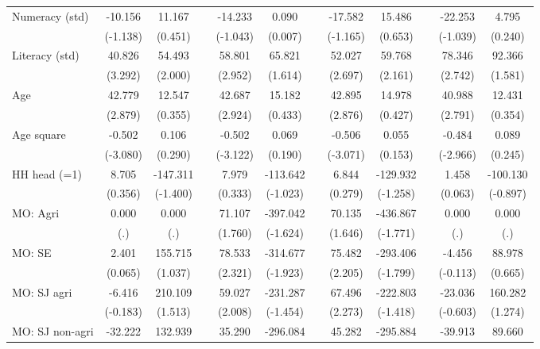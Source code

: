 {\begin{longtable}{@{\extracolsep{\fill}}lccccccccccc}
    Numeracy (std) & -10.156 & 11.167 &       & -14.233 & 0.090 &       & -17.582 & 15.486 &       & -22.253 & 4.795 \\
          & (-1.138) & (0.451) &       & (-1.043) & (0.007) &       & (-1.165) & (0.653) &       & (-1.039) & (0.240) \\
    Literacy (std) & 40.826 & 54.493 &       & 58.801 & 65.821 &       & 52.027 & 59.768 &       & 78.346 & 92.366 \\
          & (3.292) & (2.000) &       & (2.952) & (1.614) &       & (2.697) & (2.161) &       & (2.742) & (1.581) \\
    Age   & 42.779 & 12.547 &       & 42.687 & 15.182 &       & 42.895 & 14.978 &       & 40.988 & 12.431 \\
          & (2.879) & (0.355) &       & (2.924) & (0.433) &       & (2.876) & (0.427) &       & (2.791) & (0.354) \\
    Age square & -0.502 & 0.106 &       & -0.502 & 0.069 &       & -0.506 & 0.055 &       & -0.484 & 0.089 \\
          & (-3.080) & (0.290) &       & (-3.122) & (0.190) &       & (-3.071) & (0.153) &       & (-2.966) & (0.245) \\
    HH head (=1) & 8.705 & -147.311 &       & 7.979 & -113.642 &       & 6.844 & -129.932 &       & 1.458 & -100.130 \\
          & (0.356) & (-1.400) &       & (0.333) & (-1.023) &       & (0.279) & (-1.258) &       & (0.063) & (-0.897) \\
    MO: Agri & 0.000 & 0.000 &       & 71.107 & -397.042 &       & 70.135 & -436.867 &       & 0.000 & 0.000 \\
          & (.)   & (.)   &       & (1.760) & (-1.624) &       & (1.646) & (-1.771) &       & (.)   & (.) \\
    MO: SE & 2.401 & 155.715 &       & 78.533 & -314.677 &       & 75.482 & -293.406 &       & -4.456 & 88.978 \\
          & (0.065) & (1.037) &       & (2.321) & (-1.923) &       & (2.205) & (-1.799) &       & (-0.113) & (0.665) \\
    MO: SJ agri & -6.416 & 210.109 &       & 59.027 & -231.287 &       & 67.496 & -222.803 &       & -23.036 & 160.282 \\
          & (-0.183) & (1.513) &       & (2.008) & (-1.454) &       & (2.273) & (-1.418) &       & (-0.603) & (1.274) \\
    MO: SJ non-agri & -32.222 & 132.939 &       & 35.290 & -296.084 &       & 45.282 & -295.884 &       & -39.913 & 89.660 \\

\end{longtable}}

